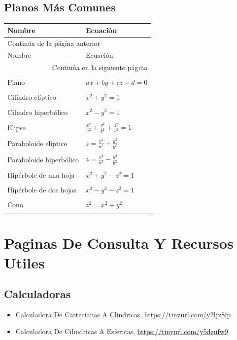\documentclass{article}
\begin{document}
\subsection{Planos Más Comunes}
\label{sec:orge982cd0}
\begin{longtable}{|p{6cm}|p{5cm}|}
\hline
Nombre & Ecuación\\
\hline
\endfirsthead
\multicolumn{2}{l}{Continúa de la página anterior} \\
\hline

Nombre & Ecuación \\

\hline
\endhead
\hline\multicolumn{2}{r}{Continúa en la siguiente página} \\
\endfoot
\endlastfoot
\hline
 & \\
Plano & \(ax+by+cz+d=0\)\\
 & \\
Cilindro elíptico & \(x^2+y^2=1\)\\
 & \\
Cilindro hiperbólico & \(x^2-y^2=1\)\\
 & \\
Elipse & \(\frac{x^2}{a^2}+\frac{y^2}{b^2}+\frac{z^2}{c^2}=1\)\\
 & \\
Paraboloide elíptico & \(z=\frac{x^2}{a^2}+\frac{y^2}{b^2}\)\\
 & \\
Paraboloide hiperbólico & \(z=\frac{x^2}{a^2}-\frac{y^2}{b^2}\)\\
 & \\
Hipérbole de una hoja & \(x^2 + y^2 - z^2 = 1\)\\
 & \\
Hipérbole de dos hojas & \(x^2 - y^2 - z^2 = 1\)\\
 & \\
Cono & \(z^2 = x^2 + y^2\)\\
 & \\
\hline
\end{longtable}

\section{Paginas De Consulta Y Recursos Utiles}
\label{sec:org2a22693}
\subsection{Calculadoras}
\label{sec:org1899e3c}
\begin{itemize}
\item Calculadora De Cartecianas A Clindricas, \url{https://tinyurl.com/y2ljx8fp}
\item Calculadora De Cilindricas A Esfericas, \url{https://tinyurl.com/y5dzufw9}
\end{itemize}
\end{document}
